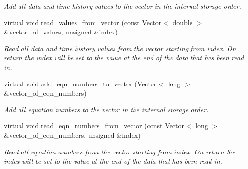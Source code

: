 \begin{DoxyCompactItemize}
\begin{DoxyCompactList}\small\item\em Add all data and time history values to the vector in the internal storage order. \end{DoxyCompactList}\item 
virtual void \hyperlink{classoomph_1_1Data_a6b8bc02debd1bce8e1bfc68cd9a54695}{read\+\_\+values\+\_\+from\+\_\+vector} (const \hyperlink{classoomph_1_1Vector}{Vector}$<$ double $>$ \&vector\+\_\+of\+\_\+values, unsigned \&index)
\begin{DoxyCompactList}\small\item\em Read all data and time history values from the vector starting from index. On return the index will be set to the value at the end of the data that has been read in. \end{DoxyCompactList}\item 
virtual void \hyperlink{classoomph_1_1Data_a1d3f7c4200506d11fea3c647fe498f5d}{add\+\_\+eqn\+\_\+numbers\+\_\+to\+\_\+vector} (\hyperlink{classoomph_1_1Vector}{Vector}$<$ long $>$ \&vector\+\_\+of\+\_\+eqn\+\_\+numbers)
\begin{DoxyCompactList}\small\item\em Add all equation numbers to the vector in the internal storage order. \end{DoxyCompactList}\item 
virtual void \hyperlink{classoomph_1_1Data_ae958e52df6ede2a08f957db4ee685ca7}{read\+\_\+eqn\+\_\+numbers\+\_\+from\+\_\+vector} (const \hyperlink{classoomph_1_1Vector}{Vector}$<$ long $>$ \&vector\+\_\+of\+\_\+eqn\+\_\+numbers, unsigned \&index)
\begin{DoxyCompactList}\small\item\em Read all equation numbers from the vector starting from index. On return the index will be set to the value at the end of the data that has been read in. \end{DoxyCompactList}\end{DoxyCompactItemize}
